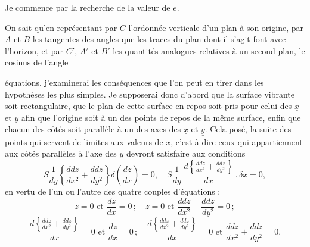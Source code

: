 \documentclass[11pt,a4paper]{article}
\begin{document}
Je commence par la recherche de la valeur de $\underline{e}$.

On sait qu'en représentant par $\underline{C}$ l'ordonnée verticale d'un plan à
son origine, par $A$ et $B$ les tangentes des angles que les traces du
plan dont il s'agit font avec l'horizon, et par $C'$, $A'$ et $B'$ les
quantités analogues relatives à un second plan, le cosinus de l'angle



équations, j'examinerai les conséquences que l'on peut en tirer dans les
hypothèses les plus simples. Je supposerai donc d'abord que la surface
vibrante soit rectangulaire, que le plan de cette surface en repos soit
pris pour celui des $\underline{x}$ et $y$ afin que l'origine soit à un des points
de repos de la même surface, enfin que chacun des côtés soit parallèle
à un des axes des $\underline{x}$ et $\underline{y}$. Cela posé, la suite des points qui servent
de limites aux valeurs de $\underline{x}$, c'est-à-dire ceux qui appartiennent aux
côtés parallèles à l'axe des $y$ devront satisfaire aux conditions
\[ S\frac{1}{dy}\left\{\frac{ddz}{dx^2}+\frac{ddz}{dy^2}\right\}\delta\!\left(\frac{dz}{dx}\right)=0, \quad S\frac{1}{dy}\,\frac{d\left\{\frac{ddz}{dx^2}+\frac{ddz}{dy^2}\right\}}{dx}\,.\,\delta x=0, \]
en vertu de l'un ou l'autre des quatre couples d'équations :
\[ z=0 \text{ et } \frac{dz}{dx}=0\,; \quad z=0 \text{ et } \frac{ddz}{dx^2}+\frac{ddz}{dy^2}=0\,; \]
\[ \frac{d\left\{\frac{ddz}{dx^2}+\frac{ddz}{dy^2}\right\}}{dx}=0 \text{ et } \frac{dz}{dx}=0\,; \quad \frac{d\left\{\frac{ddz}{dx^2}+\frac{ddz}{dy^2}\right\}}{dx}=0 \text{ et } \frac{ddz}{dx^2}+\frac{ddz}{dy^2}=0. \]
\end{document}
